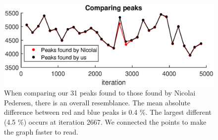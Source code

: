 \begin{figure}[H]
    \centering
    \includegraphics[width=1.0\textwidth]{3Results/fig/comparingPeaks.eps}
    \caption{When comparing our 31 peaks found to those found by Nicolai Pedersen, there is an overall resemblance. The mean absolute difference between red and blue peaks is 0.4 $\%$. The largest different (4.5 $\%$) occurs at iteration 2667. We connected the points to make the graph faster to read.}
    \label{fig:comparing_peaks}
\end{figure}

